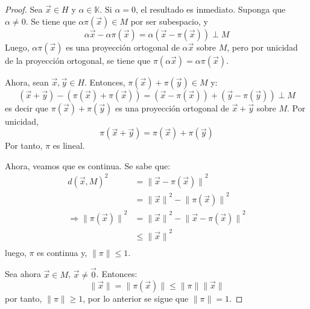 \documentclass[12pt]{report}
\newcounter{it}
\theoremstyle{largebreak}
\newcommand\norm[1]{\ensuremath{\|#1\|}}
\begin{document}
    \begin{proof}
        Sea $\vec{x}\in H$ y $\alpha\in\mathbb{K}$. Si $\alpha=0$, el resultado es inmediato. Suponga que $\alpha\neq 0$. Se tiene que $\alpha\pi(\vec{x})\in M$ por ser subespacio, y
        \begin{equation*}
            \alpha\vec{x}-\alpha\pi(\vec{x})=\alpha(\vec{x}-\pi(\vec{x}))\perp M
        \end{equation*}
        Luego, $\alpha\pi(\vec{x})$ es una proyección ortogonal de $\alpha\vec{x}$ sobre $M$, pero por unicidad de la proyección ortogonal, se tiene que $\pi(\alpha\vec{x})=\alpha\pi(\vec{x})$.

        Ahora, sean $\vec{x},\vec{y}\in H$. Entonces, $\pi(\vec{x})+\pi(\vec{y})\in M$ y:
        \begin{equation*}
            (\vec{x}+\vec{y})-(\pi(\vec{x})+\pi(\vec{x}))=(\vec{x}-\pi(\vec{x}))+(\vec{y}-\pi(\vec{y}))\perp M
        \end{equation*}
        es decir que $\pi(\vec{x})+\pi(\vec{y})$ es una proyección ortogonal de $\vec{x}+\vec{y}$ sobre $M$. Por unicidad,
        \begin{equation*}
            \pi(\vec{x}+\vec{y})=\pi(\vec{x})+\pi(\vec{y})
        \end{equation*}
        Por tanto, $\pi$ es lineal.


        Ahora, veamos que es continua. Se sabe que:
        \begin{equation*}
            \begin{split}
                d(\vec{x},M)^2&=\norm{\vec{x}-\pi(\vec{x})}^2\\
                &=\norm{\vec{x}}^2-\norm{\pi(\vec{x})}^2\\
                \Rightarrow \norm{\pi(\vec{x})}^2&=\norm{\vec{x}}^2-\norm{\vec{x}-\pi(\vec{x})}^2\\
                &\leq\norm{\vec{x}}^2\\
            \end{split}
        \end{equation*}
        luego, $\pi$ es continua y, $\norm{\pi}\leq 1$.

        Sea ahora $\vec{x}\in M$, $\vec{x}\neq\vec{0}$. Entonces:
        \begin{equation*}
            \norm{\vec{x}}=\norm{\pi(\vec{x})}\leq\norm{\pi}\norm{\vec{x}}
        \end{equation*}
        por tanto, $\norm{\pi}\geq 1$, por lo anterior se sigue que $\norm{\pi}=1$.


\end{proof}
\end{document}
